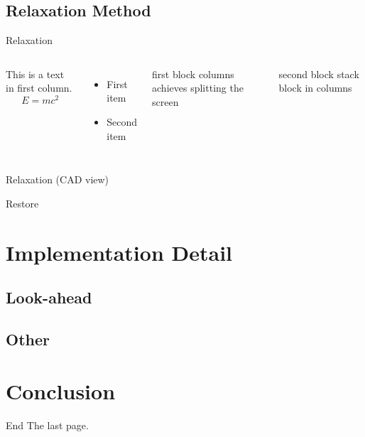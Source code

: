 \subsection{Relaxation Method}

\begin{frame}{Relaxation}
    \begin{columns}
        This is a text in first column.
        $$E=mc^2$$
        \begin{itemize}
        \item First item
        \item Second item
        \end{itemize}
        
        \begin{block}{first block}
            columns achieves splitting the screen
        \end{block}
        \begin{block}{second block}
            stack block in columns
        \end{block}
        
    \end{columns}
\end{frame}

\begin{frame}{Relaxation (CAD view)}
    
\end{frame}

\begin{frame}{Restore}
    
\end{frame}

\section{Implementation Detail}
\subsection{Look-ahead}
\subsection{Other}

\section{Conclusion}

\begin{frame}{End}
    The last page.
\end{frame}